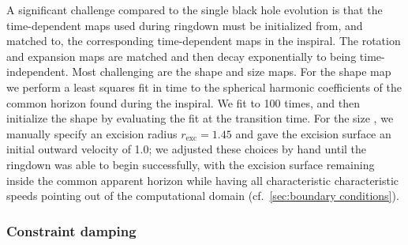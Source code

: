 \begin{bibunit}[unsrtnat]
A significant challenge compared to the single black hole evolution is that the
time-dependent maps used during ringdown must be initialized from, and matched
to, the corresponding time-dependent maps in the inspiral. The rotation and
expansion maps are matched and then decay exponentially to being
time-independent. Most challenging are the shape and size maps. For the shape
map we perform a least squares fit in time to the spherical harmonic
coefficients of the common horizon  found during the
inspiral. We fit to 100 times, and then initialize the shape  by
evaluating the fit at the transition time. For the size , we
manually specify an excision radius $r_{\mathrm{exc}} = 1.45$ and gave the
excision surface an initial outward  velocity of 1.0; we adjusted these
choices by hand until the ringdown was able to begin successfully, with the
excision surface remaining inside the common apparent horizon while having all
characteristic characteristic speeds pointing out of the computational domain
(cf.~\ref{sec:boundary conditions}).


\subsubsection{Constraint damping}


\end{bibunit}
